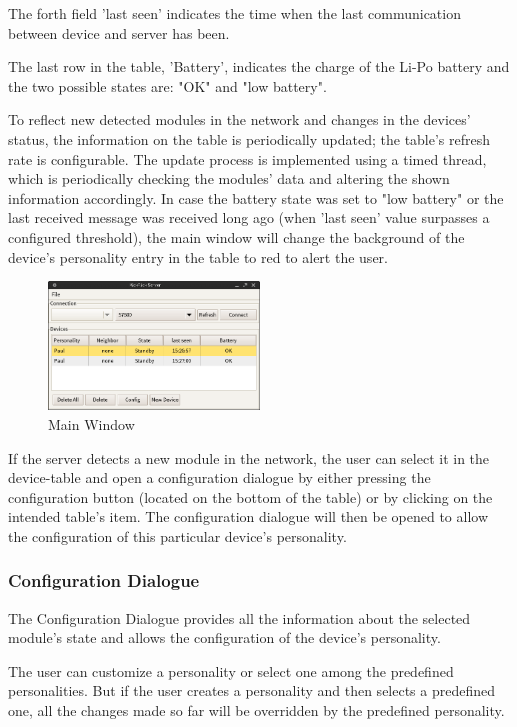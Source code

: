 The forth field 'last seen' indicates the time when the last communication between device and server has been.

The last row in the table, 'Battery', indicates the charge of the Li-Po battery and the two possible states are: "OK" and "low battery".

To reflect new detected modules in the network and changes in the devices' status, the information on the table is periodically updated; the table's refresh rate is configurable. 
The update process is implemented using a timed thread, which is periodically checking the modules' data and altering the shown information accordingly. In case the battery state was set to "low battery" or the last received message was received long ago (when 'last seen' value surpasses a configured threshold), the main window will change the background of the device's  personality entry in the table to red to alert the user. 
\begin{figure}[h!]
 \centering
 \includegraphics[width= 0.5\textwidth, clip=true  ,keepaspectratio=true]{./pic/java-server-main.png}
 \caption{Main Window}
 \label{java-server-main}
\end{figure}

If the server detects a new module in the network, the user can select it in the device-table and open a configuration dialogue by either pressing the configuration button (located on the bottom of the table) or by clicking on the intended table's item. The configuration dialogue will then be opened to allow the configuration of this particular device's personality.

\subsubsection{Configuration Dialogue}

The Configuration Dialogue provides all the information about the selected module's state and allows the configuration of the device's personality. 

The user can customize a personality or select one among the predefined personalities. But if the user creates a personality and then selects a predefined one, all the changes made so far will be overridden by the predefined personality. 

